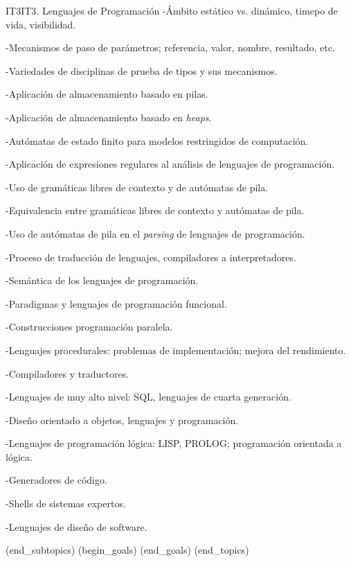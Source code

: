 \begin{BKL2}{IT3}{IT3. Lenguajes de Programación}
-Ámbito estático vs. dinámico, timepo de vida, visibilidad.

-Mecanismos de paso de parámetros; referencia, valor, nombre, resultado, etc.

-Variedades de disciplinas de prueba de tipos y sus mecanismos.

-Aplicación de almacenamiento basado en pilas.

-Aplicación de almacenamiento basado en {\it heaps}.

-Autómatas de estado finito para modelos restringidos de computación.

-Aplicación de expresiones regulares al análisis de lenguajes de programación.

-Uso de gramáticas libres de contexto y de autómatas de pila.

-Equivalencia entre gramáticas libres de contexto y autómatas de pila.

-Uso de autómatas de pila en el {\it parsing} de lenguajes de programación.

-Proceso de traducción de lenguajes, compiladores a interpretadores.

-Semántica de los lenguajes de programación.

-Paradigmas y lenguajes de programación funcional.

-Construcciones programación paralela.

-Lenguajes procedurales: problemas de implementación; mejora del rendimiento.

-Compiladores y traductores.

-Lenguajes de muy alto nivel: SQL, lenguajes de cuarta generación.

-Diseño orientado a objetos, lenguajes y programación.

-Lenguajes de programación lógica: LISP, PROLOG; programación orientada a lógica.

-Generadores de código.

-Shells de sistemas expertos.

-Lenguajes de diseño de software.

(end_subtopics)
(begin_goals)
(end_goals)
(end_topics)

\end{BKL2}
 

